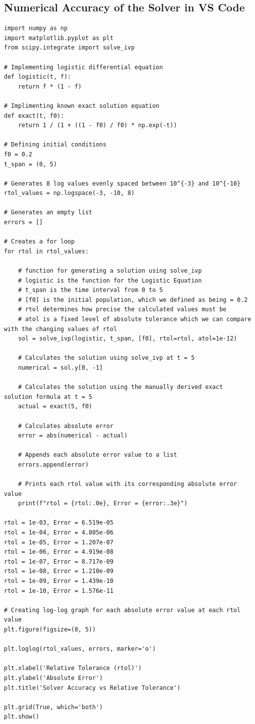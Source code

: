 \documentclass[11pt]{article}
\begin{document}
\subsection*{Numerical Accuracy of the Solver in VS Code}
\begin{verbatim}
import numpy as np
import matplotlib.pyplot as plt
from scipy.integrate import solve_ivp

# Implementing logistic differential equation
def logistic(t, f):
    return f * (1 - f)

# Implimenting known exact solution equation
def exact(t, f0):
    return 1 / (1 + ((1 - f0) / f0) * np.exp(-t))

# Defining initial conditions
f0 = 0.2
t_span = (0, 5)

# Generates 8 log values evenly spaced between 10^{-3} and 10^{-10}
rtol_values = np.logspace(-3, -10, 8)

# Generates an empty list
errors = []

# Creates a for loop
for rtol in rtol_values:

    # function for generating a solution using solve_ivp
    # logistic is the function for the Logistic Equation
    # t_span is the time interval from 0 to 5
    # [f0] is the initial population, which we defined as being = 0.2
    # rtol determines how precise the calculated values must be
    # atol is a fixed level of absolute tolerance which we can compare with the changing values of rtol
    sol = solve_ivp(logistic, t_span, [f0], rtol=rtol, atol=1e-12)

    # Calculates the solution using solve_ivp at t = 5
    numerical = sol.y[0, -1]

    # Calculates the solution using the manually derived exact solution formula at t = 5
    actual = exact(5, f0)

    # Calculates absolute error
    error = abs(numerical - actual)

    # Appends each absolute error value to a list
    errors.append(error)

    # Prints each rtol value with its corresponding absolute error value
    print(f"rtol = {rtol:.0e}, Error = {error:.3e}")

rtol = 1e-03, Error = 6.519e-05
rtol = 1e-04, Error = 4.805e-06
rtol = 1e-05, Error = 1.207e-07
rtol = 1e-06, Error = 4.919e-08
rtol = 1e-07, Error = 8.717e-09
rtol = 1e-08, Error = 1.210e-09
rtol = 1e-09, Error = 1.439e-10
rtol = 1e-10, Error = 1.576e-11

# Creating log-log graph for each absolute error value at each rtol value
plt.figure(figsize=(8, 5))

plt.loglog(rtol_values, errors, marker='o')

plt.xlabel('Relative Tolerance (rtol)')
plt.ylabel('Absolute Error')
plt.title('Solver Accuracy vs Relative Tolerance')

plt.grid(True, which='both')
plt.show()
\end{verbatim}
\end{document}

